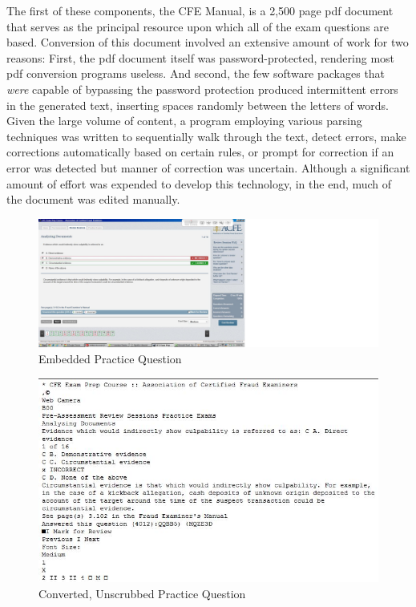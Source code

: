 The first of these components, the CFE Manual, is a 2,500 page pdf document that serves as the principal resource upon which all of the exam questions are based.  Conversion of this document involved an extensive amount of work for two reasons:  First, the pdf document itself was password-protected, rendering most pdf conversion programs useless.  And second, the few software packages that \textit{were} capable of bypassing the password protection produced intermittent errors in the generated text, inserting spaces randomly between the letters of words.  Given the large volume of content, a program employing various parsing techniques was written to sequentially walk through the text, detect errors, make corrections automatically based on certain rules, or prompt for correction if an error was detected but manner of correction was uncertain.  Although a significant amount of effort was expended to develop this technology, in the end, much of the document was edited manually.  

\begin{figure}
\centering
\vspace{2.0in}
\includegraphics[width=200mm]{study_package_screen_shot.jpg}
\caption{Embedded Practice Question}
\label{fig:study_package_screen_shot}
\end{figure}

\begin{figure}
\centering
\vspace{2.0in}
\includegraphics[scale=0.75]{study_package_unformatted_text.jpg}
\caption{Converted, Unscrubbed Practice Question}
\label{fig:study_package_unformatted_text}
\end{figure}

